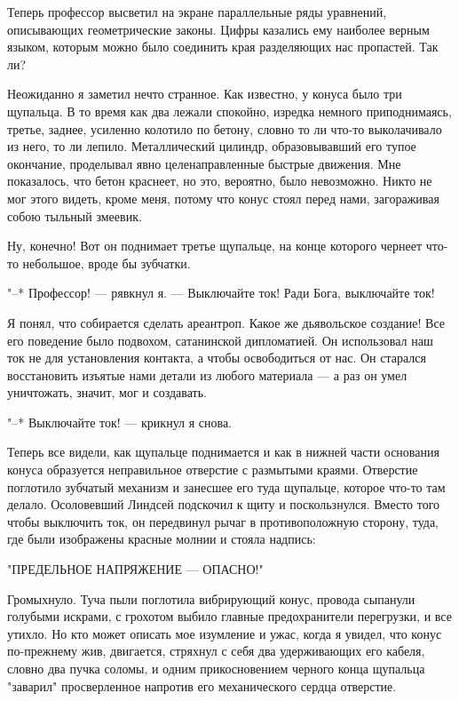 Теперь  профессор  высветил  на  экране  параллельные  ряды  уравнений,
описывающих геометрические законы.  Цифры  казались  ему  наиболее  верным
языком, которым можно было соединить края разделяющих нас  пропастей.  Так
ли?

Неожиданно я заметил нечто странное. Как известно, у  конуса  было  три
щупальца.  В  то  время  как  два   лежали   спокойно,   изредка   немного
приподнимаясь, третье, заднее, усиленно колотило по бетону, словно  то  ли
что-то  выколачивало  из  него,  то  ли  лепило.  Металлический   цилиндр,
образовывавший  его  тупое  окончание,  проделывал  явно  целенаправленные
быстрые движения. Мне показалось, что бетон краснеет,  но  это,  вероятно,
было невозможно. Никто не мог этого видеть, кроме меня, потому  что  конус
стоял перед нами, загораживая собою тыльный змеевик.

Ну, конечно! Вот  он  поднимает  третье  щупальце,  на  конце  которого
чернеет что-то небольшое, вроде бы зубчатки.

"--* Профессор! --- рявкнул я. --- Выключайте ток! Ради Бога, выключайте ток!

Я  понял,  что  собирается  сделать  ареантроп.  Какое  же  дьявольское
создание! Все его поведение было  подвохом,  сатанинской  дипломатией.  Он
использовал наш ток не для установления контакта, а чтобы освободиться  от
нас. Он старался восстановить изъятые нами детали из любого материала ---  а
раз он умел уничтожать, значит, мог и создавать.

"--* Выключайте ток! --- крикнул я снова.

Теперь все видели, как  щупальце  поднимается  и  как  в  нижней  части
основания конуса образуется неправильное  отверстие  с  размытыми  краями.
Отверстие поглотило  зубчатый  механизм  и  занесшее  его  туда  щупальце,
которое  что-то  там  делало.  Осоловевший  Линдсей  подскочил  к  щиту  и
поскользнулся. Вместо того чтобы выключить  ток,  он  передвинул  рычаг  в
противоположную сторону, туда, где были изображены красные молнии и стояла
надпись:

"ПРЕДЕЛЬНОЕ НАПРЯЖЕНИЕ --- ОПАСНО!"

Громыхнуло. Туча пыли поглотила  вибрирующий  конус,  провода  сыпанули
голубыми искрами, с грохотом выбило главные предохранители  перегрузки,  и
все утихло. Но кто может описать мое изумление и ужас, когда я увидел, что
конус по-прежнему жив, двигается, стряхнул с  себя  два  удерживающих  его
кабеля, словно два пучка соломы,  и  одним  прикосновением  черного  конца
щупальца  "заварил"  просверленное  напротив  его   механического   сердца
отверстие.

